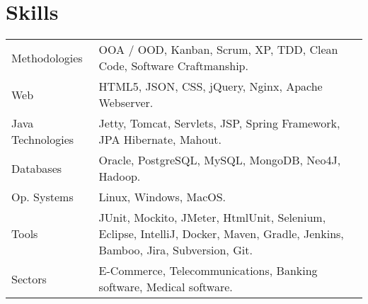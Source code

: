 \section*{Skills}
\begin{longtable}{@{}p{6cm}p{10cm}}
Methodologies 	    & OOA / OOD, Kanban, Scrum, XP, TDD, Clean Code, Software Craftmanship.\\
Web         	    & HTML5, JSON, CSS, jQuery, Nginx, Apache Webserver.\\
Java Technologies	& Jetty, Tomcat, Servlets, JSP, Spring Framework, JPA Hibernate, Mahout.\\
Databases       	& Oracle, PostgreSQL, MySQL, MongoDB, Neo4J, Hadoop.\\
Op. Systems  	    & Linux, Windows, MacOS.\\
Tools   		    & JUnit, Mockito, JMeter, HtmlUnit, Selenium, Eclipse, IntelliJ, Docker, Maven, Gradle, Jenkins, Bamboo, Jira, Subversion, Git.\\
Sectors 		    & E-Commerce, Telecommunications, Banking software, Medical software.\\
\end{longtable}
